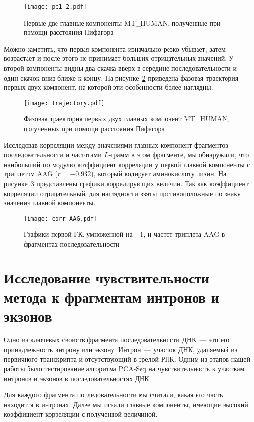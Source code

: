 \begin{figure}[!t]
  \centering
  \texttt{[image: pc1-2.pdf]}
  \caption{Первые две главные компоненты MT\_HUMAN, полученные при помощи расстояния Пифагора}
  \label{pc1-2}
\end{figure}

Можно заметить, что первая компонента изначально резко убывает, затем возрастает и после этого не принимает больших отрицательных значений. У второй компоненты видны два скачка вверх в середине последовательности и один скачок вниз ближе к концу. На рисунке~\ref{trajectory} приведена фазовая траектория первых двух компонент, на которой эти особенности более наглядны.

\begin{figure}[!t]
  \centering
  \texttt{[image: trajectory.pdf]}
  \caption{Фазовая траектория первых двух главных компонент MT\_HUMAN, полученных при помощи расстояния Пифагора}
  \label{trajectory}
\end{figure}

Исследовав корреляции между значениями главных компонент фрагментов последовательности и частотами $L$-грамм в этом фрагменте, мы обнаружили, что наибольший по модулю коэффициент корреляции у первой главной компоненты с триплетом AAG ($r = -0.932$), который кодирует аминокислоту лизин. На рисунке~\ref{corr-AAG} представлены графики коррелирующих величин. Так как коэффициент корреляции отрицательный, для наглядности взяты противоположные по знаку значения главной компоненты.

\begin{figure}[!t]
  \centering
  \texttt{[image: corr-AAG.pdf]}
  \caption{Графики первой ГК, умноженной на $-1$, и частот триплета AAG в фрагментах последовательности}
  \label{corr-AAG}
\end{figure}

\section{Исследование чувствительности метода к фрагментам интронов и экзонов}

Одно из ключевых свойств фрагмента последовательности ДНК~--- это его принадлежность интрону или экзону. Интрон~--- участок ДНК, удаляемый из первичного транскрипта и отсутствующий в зрелой РНК. Одним из этапов нашей работы было тестирование алгоритма PCA-Seq на чувствительность к участкам интронов и экзонов в последовательностях ДНК.

Для каждого фрагмента последовательности мы считали, какая его часть находится в интронах. Далее мы искали главные компоненты, имеющие высокий коэффициент корреляции с полученной величиной.


